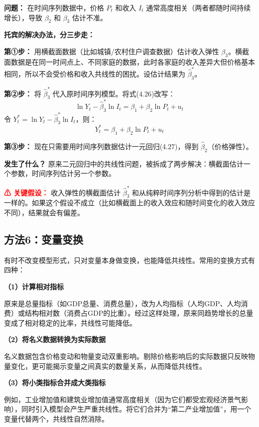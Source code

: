 \documentclass[12pt,a4paper]{ctexart}
\begin{document}
\textbf{问题：} 在时间序列数据中，价格 $P_t$ 和收入 $I_t$ 通常高度相关（两者都随时间持续增长），导致 $\beta_2$ 和 $\beta_3$ 估计不准。

\textbf{托宾的解决办法，分三步走：}

\textbf{第①步：} 用横截面数据（比如城镇/农村住户调查数据）估计收入弹性 $\beta_3$。横截面数据是在同一时间点上、不同家庭的数据，此时各家庭的收入差异大但价格基本相同，所以不会受价格和收入共线性的困扰。设估计结果为 $\hat{\beta}_3^*$。

\textbf{第②步：} 将 $\hat{\beta}_3^*$ 代入原时间序列模型。将式(4.26)改写：
\[
\ln Y_t - \hat{\beta}_3^* \ln I_t = \beta_1 + \beta_2 \ln P_t + u_t
\]
令 $Y_t^* = \ln Y_t - \hat{\beta}_3^* \ln I_t$，则：
\begin{equation}
Y_t^* = \beta_1 + \beta_2 \ln P_t + u_t \tag{4.27}
\end{equation}

\textbf{第③步：} 现在只需要用时间序列数据估计一元回归(4.27)，得到 $\hat{\beta}_2$（价格弹性）。

\textbf{发生了什么？} 原来二元回归中的共线性问题，被拆成了两步解决：横截面估计一个参数，时间序列估计另一个参数。

\textcolor{red}{\textbf{⚠ 关键假设：}} 收入弹性的横截面估计 $\hat{\beta}_3^*$ 和从纯粹时间序列分析中得到的估计是一样的。如果这个假设不成立（比如横截面上的收入效应和随时间变化的收入效应不同），结果就会有偏差。

\subsection{方法6：变量变换}

有时不改变模型形式，只对变量本身做变换，也能降低共线性。常用的变换方式有四种：

\textbf{（1）计算相对指标}

原来是总量指标（如GDP总量、消费总量），改为人均指标（人均GDP、人均消费）或结构相对数（消费占GDP的比重）。经过这样处理，原来同趋势增长的总量变成了相对稳定的比率，共线性可能降低。

\textbf{（2）将名义数据转换为实际数据}

名义数据包含价格变动和物量变动双重影响。剔除价格影响后的实际数据只反映物量变化，更可能揭示变量之间真实的数量关系，从而降低共线性。

\textbf{（3）将小类指标合并成大类指标}

例如，工业增加值和建筑业增加值通常高度相关（因为它们都受宏观经济景气影响），同时引入模型会产生严重共线性。将它们合并为“第二产业增加值”，用一个变量代替两个，共线性自然消除。
\end{document}
